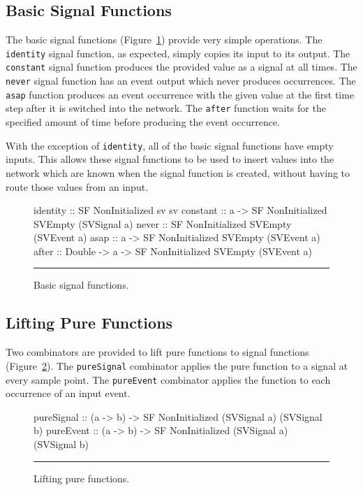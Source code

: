 \subsection{Basic Signal Functions}
\label{subsection:System_Design_and_Interface-Combinators-Basic_Signal_Functions}

The basic signal functions (Figure~\ref{figure:basic_signal_functions})
provide very simple operations. The {\tt identity} signal function, as expected,
simply copies its input to its output. The {\tt constant} signal function
produces the provided value as a signal at all times. The {\tt never} signal
function has an event output which never produces occurrences. The {\tt asap}
function produces an event occurrence with the given value at the first time
step after it is switched into the network. The {\tt after} function waits for
the specified amount of time before producing the event occurrence.

With the exception of {\tt identity}, all of the basic signal functions have
empty inputs. This allows these signal functions to be used to insert values
into the network which are known when the signal function is created, without
having to route those values from an input.

\begin{figure}
\begin{code}
identity :: SF NonInitialized sv sv
constant :: a -> SF NonInitialized SVEmpty (SVSignal a)
never    :: SF NonInitialized SVEmpty (SVEvent a)
asap     :: a -> SF NonInitialized SVEmpty (SVEvent a)
after    :: Double -> a -> SF NonInitialized SVEmpty (SVEvent a)
\end{code}
\hrule
\caption{Basic signal functions.}
\label{figure:basic_signal_functions}
\end{figure}

\subsection{Lifting Pure Functions}
\label{subsection:System_Design_and_Interface-Combinators-Lifting_Pure_Functions}

Two combinators are provided to lift pure functions to signal functions (Figure~\ref{figure:lifting_pure_functions}).
The {\tt pureSignal} combinator applies the pure function to a signal at every
sample point. The {\tt pureEvent} combinator applies the function to each
occurrence of an input event.

\begin{figure}
\begin{code}
pureSignal ::    (a -> b) 
              -> SF NonInitialized (SVSignal a) (SVSignal b)
pureEvent  ::    (a -> b)
              -> SF NonInitialized (SVSignal a) (SVSignal b)
\end{code}
\hrule
\caption{Lifting pure functions.}
\label{figure:lifting_pure_functions}
\end{figure}

